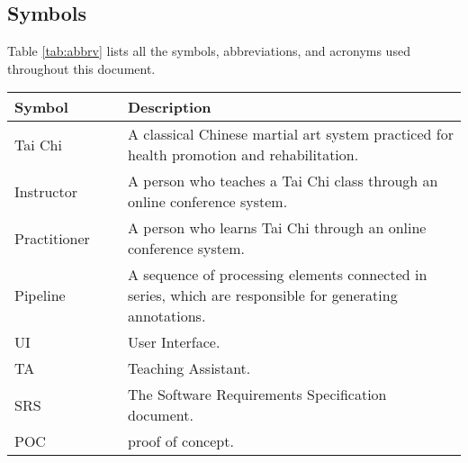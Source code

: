 \documentclass[12pt, titlepage]{article}
\begin{document}
\subsection{Symbols}
Table \ref{tab:abbrv} lists all the symbols, abbreviations, and acronyms used
throughout this document.
\begin{table}[H]
  \centering
  \begin{tabular}{L{0.25\linewidth}L{0.8\linewidth}} \toprule
    \textbf{Symbol}        & \textbf{Description}                                                                                                                                                                     \\ \midrule
    Tai Chi          & A classical Chinese martial art system practiced for health promotion and rehabilitation.                                                                                          \\
    Instructor       & A person who teaches a Tai Chi class through an online conference system.                                                                                                          \\
    Practitioner     & A person who learns Tai Chi through an online conference system.                                                                                                                   \\
    Pipeline         & A sequence of processing elements connected in series, which are responsible for generating annotations.                                                                           \\
    UI               & User Interface.                                                                                                                                                                    \\
    TA               & Teaching Assistant.                                                                                                                                                                \\
    SRS              & The Software Requirements Specification document.                                                                                                                                  \\
    POC              & proof of concept.                                                                                                                                                                  \\

\end{tabular}
\end{table}
\end{document}

